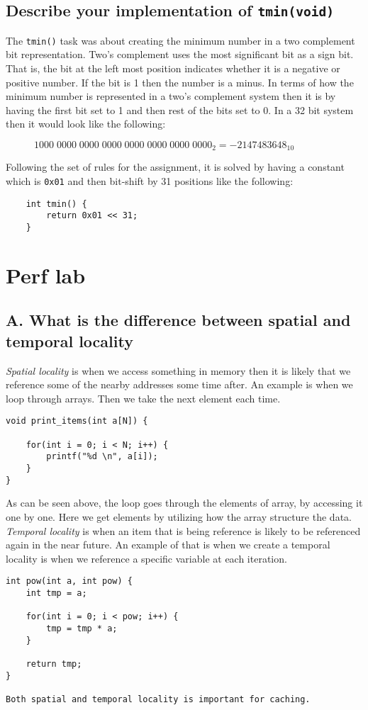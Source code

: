 \documentclass[11pt]{article}
\newcommand{\code}[1]{{\colorbox{lightgray!15}{\color{orange}\texttt{#1}}}}
\begin{document}
\subsection{Describe your implementation of \code{tmin(void)}}
The \code{tmin()} task was about creating the minimum number in a two complement bit representation.
Two's complement uses the most significant bit as a sign bit. That is, the bit at the left most position indicates whether 
it is a negative or positive number. If the bit is 1 then the number is a minus. 
In terms of how the minimum number is represented in a two's complement system then it is by having the first bit set to 1 and then rest of the bits set to 0.
In a 32 bit system then it would look like the following:

\begin{figure}[h]
    $1000 \; 0000 \; 0000 \; 0000 \; 0000 \; 0000 \; 0000 \; 0000_2 = -2147483648_{10}$
    \centering
\end{figure}


Following the set of rules for the assignment, it is solved by having a constant which is \code{0x01}
and then bit-shift by 31 positions like the following:
\begin{lstlisting}
    int tmin() {
        return 0x01 << 31;
    }
\end{lstlisting}


\section{Perf lab}

\subsection{A. What is the difference between spatial and temporal locality}
\textit{Spatial locality} is when we access something in memory then it is likely that we reference some of the nearby addresses some time after. An example is
when we loop through arrays. Then we take the next element each time.
\begin{lstlisting}
void print_items(int a[N]) {

    for(int i = 0; i < N; i++) {
        printf("%d \n", a[i]);
    }
}
\end{lstlisting}
As can be seen above, the loop goes through the elements of array, by accessing it one by one. Here we get elements 
by utilizing how the array structure the data. \textit{Temporal locality} is when an item that is being reference is likely to be 
referenced again in the near future. An example of that is when we create a temporal locality is when we reference a specific variable
at each iteration.
\begin{lstlisting}
int pow(int a, int pow) {
    int tmp = a;

    for(int i = 0; i < pow; i++) {
        tmp = tmp * a;
    }

    return tmp;
}

Both spatial and temporal locality is important for caching.
\end{lstlisting}
\end{document}

